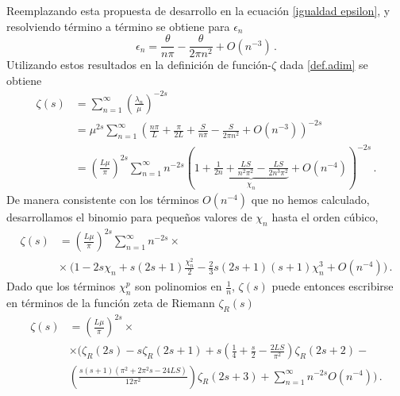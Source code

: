 Reemplazando esta propuesta de desarrollo en la ecuación \eqref{igualdad epsilon}, y resolviendo término a término se obtiene para $\epsilon _n $
\begin{equation}
    \epsilon _n = \frac{\theta}{n \pi} 
     - \frac{ \theta}{2 \pi n ^2 } + O \left( n ^{-3}\right) 
     \, .
\label{epsilons}
\end{equation}
Utilizando estos resultados en la definición de función-$\zeta$ dada \eqref{def.adim} se obtiene
\begin{align}
\nonumber
    \zeta  (s) &=  
    \sum _{n=1} ^{\infty} 
    \left( \frac{\lambda _n }{\mu } 
    	\right) ^ {- 2s}  \\
&=
\label{eq.abajo.chi}
    \mu ^{2s} \sum _{n=1} ^{\infty} 
    \left(
	\frac{n \pi}{L } + 
    \frac{\pi}{2 L } +
    \frac{S}{n \pi } -
    \frac{S}{2 \pi n ^2   } +
    O \left(  n^{-3} \right) 
    \right) ^{-2 s}  \\[5pt]    
&= 
\nonumber
	\left( \frac{L \mu }{\pi} \right) ^{2s}    
    \sum _{n=1} ^{\infty} 
    n ^{- 2 s} 
    \left(
    1 +     
    \underbrace{
        \frac{1}{2 n} + 
        \frac{L S}{n^2 \pi ^2} -
        \frac{L S}{2 n ^3 \pi ^2} } 
        _{ \chi _n} +
        O \left(n ^{-4} \right)  
    \right ) ^{-2 s}
    \, .
\end{align}
De manera consistente con los términos  $ O (n ^{-4})$ que no hemos calculado, desarrollamos el binomio para pequeños valores de $\chi _n$ hasta el orden cúbico,
\begin{align}
\label{eq.auxiliar2}
\zeta  (s) &= 
\left( \frac{L \mu }{\pi} \right) ^{2 s}
\sum _{n=1} ^{\infty}
  n  ^{-2 s} \times \\[5pt]
& \times   \ \Bigg(
	1 - 
	2 s \chi _n +  s(2s+1) \frac{\chi _n ^2}{2} - 
	\frac{2}{3} s(2s+1)(s+1) \chi _n ^3  + O \left( n ^{-4} \right) \Bigg)
	\, .
	\nonumber
\end{align}
Dado que los términos $\chi _n ^p$ son polinomios en $\frac{1}{n}$, $\zeta(s)$ puede entonces escribirse en términos de la función zeta de Riemann $\zeta _R (s)$
\begin{align}
    \zeta  (s) &= \left( \frac{L \mu }{\pi} \right) ^{2s} \times 
\\[5pt]
\nonumber
&
\times
	 \Bigg(
		\zeta _R ( 2 s ) -
		s \zeta _R ( 2s+1 ) +
		 s \left( \frac{1}{4} + \frac{s}{2} - \frac{2 L  S}{\pi ^2} \right) \zeta _R (2s +2 ) - \\[5pt]
\nonumber
		 &  \left(  
					\frac{s(s+1) ( \pi ^2 + 2 \pi ^2 s - 24 L S)}{12 \pi ^2 }
		 			\right) \zeta _R (2s+3)
		+ \sum _{n=1} ^{\infty} n ^{-2s} O ( n ^{-4})
		\Bigg)
		\, .
\end{align} 
